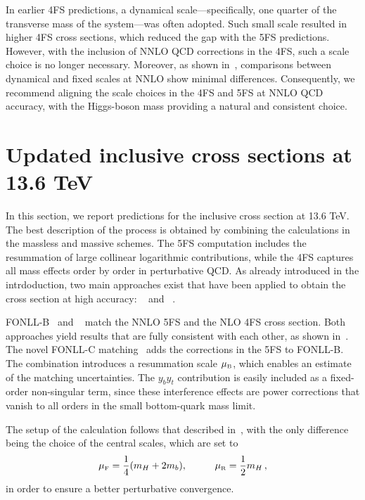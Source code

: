 \documentclass[11pt,a4paper]{article}
\begin{document}
In earlier 4FS predictions, a dynamical scale—specifically, one quarter of the transverse mass of the \bbH{} system—was often adopted. Such small scale
resulted in higher 4FS cross sections, which reduced the gap with the 5FS predictions. However, with the inclusion of NNLO QCD corrections in the 4FS, 
such a scale choice is no longer necessary. Moreover, as shown in~, comparisons between dynamical and fixed scales at NNLO 
show minimal differences. Consequently, we recommend aligning the scale choices in the 4FS and 5FS at NNLO QCD accuracy, with the Higgs-boson 
mass providing a natural and consistent choice.

\section{Updated inclusive cross sections at 13.6 TeV}
\label{sec:matchedinclusivenumbers}
In this section, we report predictions for the inclusive \bbH{}  cross section at 13.6 TeV. 
The best description of the \bbH{} process is obtained by combining the calculations in the massless and massive schemes. The 5FS computation includes 
the resummation of large collinear logarithmic contributions, while the 4FS captures all mass effects order by order in perturbative QCD. 
As already introduced in the intrdoduction, two main approaches exist that have been applied to obtain the \bbH{} cross section at 
high accuracy: \fonll{}~\cite{forte:2015hba,forte:2016sja,Duhr:2020kzd} and \nlonnllpart{}~\cite{Bonvini:2015pxa,Bonvini:2016fgf}. 

FONLL-B~\cite{forte:2015hba,forte:2016sja} and \nlonnllpart{}~\cite{Bonvini:2015pxa,Bonvini:2016fgf} match the NNLO 5FS and the NLO 4FS cross section.
Both approaches yield results that are fully consistent with each other, as shown in~. 
The novel FONLL-C matching~\cite{Duhr:2020kzd} adds the \fnnnlo{} corrections in the 5FS to FONLL-B. The \nlonnllpart{} combination introduces a resummation scale $\muB$, which enables an estimate of the 
matching uncertainties.
The $y_by_t$  contribution is easily included as a fixed-order non-singular term, since these interference effects are power corrections that 
vanish to all orders in the small bottom-quark mass limit.

The setup of the calculation follows that described in~, with the only difference being the choice of the central scales, which are set to
\begin{align}
\muF=\frac{1}{4}(m_H+2m_b),\hspace{1cm}\muR=\frac{1}{2}m_H\,,
\end{align}
in order to ensure a better perturbative convergence.
\end{document}
